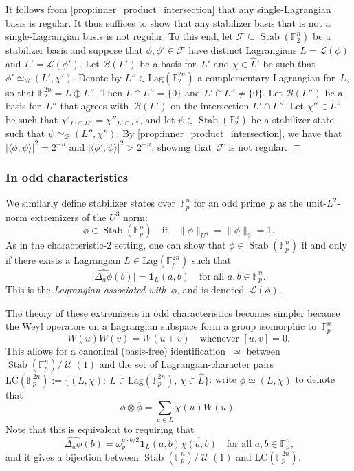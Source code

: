 \documentclass[11pt]{amsart}
\newcommand{\Lag}{\mathrm{Lag}}
\DeclareMathOperator{\Stab}{Stab}\DeclareMathOperator{\Spec}{Spec}
\newcommand{\F}{\mathbb{F}} %
\newcommand{\Lcal}{\mathcal{L}}
\newcommand{\one}{\mathbf{1}}
\DeclareMathOperator{\U}{\mathcal{U}}
\theoremstyle{plain}
\theoremstyle{definition}
\theoremstyle{remark}
\renewenvironment{proof}[1][]{
    	\begin{trivlist}
     	\item[\hspace{\labelsep}{\em\noindent Proof#1:\/}]}
     	{{\hfill$\Box$}
    	\end{trivlist}
  }
\begin{document}
\begin{proof}
It follows from \cref{prop:inner_product_intersection} that any single-Lagrangian basis is regular.
It thus suffices to show that any stabilizer basis that is not a single-Lagrangian basis is not regular.
To this end, let $\mathcal F \subseteq \Stab(\F_2^n)$ be a stabilizer basis and suppose that $\phi,\phi'\in \mathcal F$ have distinct Lagrangians $L = \mathcal L(\phi)$ and $L' = \mathcal L(\phi')$.
Let $\mathcal B(L')$ be a basis for~$L'$ and $\chi\in \widehat L'$ be such that $\phi'\simeq_{\mathcal B} (L',\mathcal \chi')$.
Denote by $L'' \in \Lag(\F_2^{2n})$ a complementary Lagrangian for~$L$, so that $\F_2^{2n} = L\oplus L''$.
Then $L\cap L'' = \{0\}$ and $L'\cap L'' \neq \{0\}$.
Let $\mathcal B(L'')$ be a basis for~$L''$ that agrees with~$\mathcal B(L')$ on the intersection $L'\cap L''$.
Let $\chi''\in \widehat L''$ be such that $\chi'_{L'\cap L''} = \chi''_{L'\cap L''}$, and let $\psi\in \Stab(\F_2^n)$ be a stabilizer state such that $\psi \simeq_{\mathcal B}(L'',\chi'')$.
By \cref{prop:inner_product_intersection}, we have that $|\langle\phi,\psi\rangle|^2 = 2^{-n}$ and $|\langle\phi',\psi\rangle|^2 > 2^{-n}$, showing that~$\mathcal F$ is not regular.
\end{proof}


\subsubsection{In odd characteristics}

We similarly define stabilizer states over~$\F_p^n$ for an odd prime~$p$ as the unit-$L^2$-norm extremizers of the $U^3$ norm:
$$\phi \in \Stab(\F_p^n) \quad \text{if} \quad \|\phi\|_{U^3} = \|\phi\|_2 = 1.$$
As in the characteristic-2 setting, one can show that $\phi \in \Stab(\F_p^n)$ if and only if there exists a Lagrangian $L\in \Lag(\F_p^{2n})$ such that
$$\big|\widehat{\Delta_a\phi}(b)\big| = \one_L(a,b) \quad \text{for all $a, b\in \F_p^n$.}$$
This is the \emph{Lagrangian associated with~$\phi$}, and is denoted~$\Lcal(\phi)$.

The theory of these extremizers in odd characteristics becomes simpler because the Weyl operators on a Lagrangian subspace form a group isomorphic to~$\F_p^n$:
$$W(u) W(v) = W(u+v) \quad \text{whenever $[u,v]=0$.}$$
This allows for a canonical (basis-free) identification~$\simeq$ between $\Stab(\F_p^n)/\U(1)$ and the set of Lagrangian-character pairs
$\mathrm{LC}(\F_p^{2n}) := \big\{(L, \chi):\: L\in \Lag(\F_p^{2n}),\, \chi\in \widehat{L}\big\}$:
write $\phi \simeq (L,\chi)$ to denote that
$$\phi \otimes \overline{\phi} = \sum_{u\in L} \chi(u) W(u).$$
Note that this is equivalent to requiring that
$$\widehat{\Delta_a \phi}(b) = \omega_p^{a\cdot b/2} \one_L(a,b) \overline{\chi(a,b)} \quad \text{for all $a, b\in \F_p^n$,}$$
and it gives a bijection between $\Stab(\F_p^n)/\U(1)$ and $\mathrm{LC}(\F_p^{2n})$.
\end{document}
